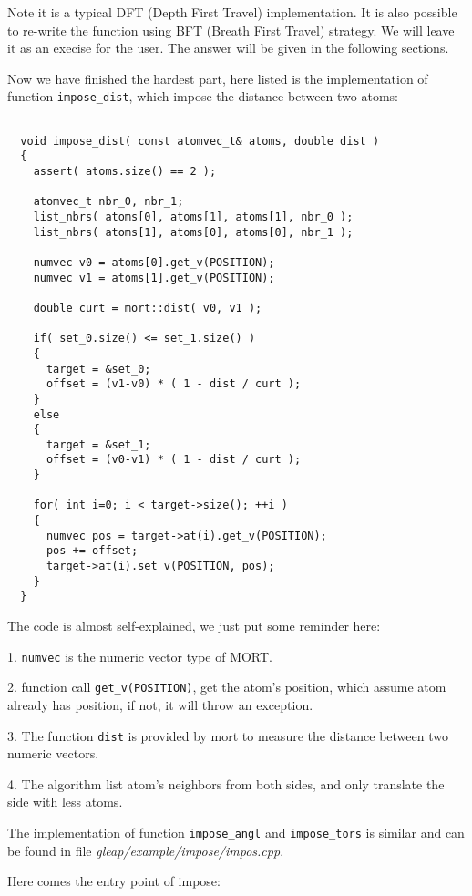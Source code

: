 \documentclass[letterpaper]{book}
\begin{document}
Note it is a typical DFT (Depth First Travel) implementation. It is also possible to  
re-write the function using BFT (Breath First Travel) strategy. We will leave it as an execise
for the user. The answer will be given in the following sections.
 
Now we have finished the hardest part, here listed is the implementation of function 
\lstinline$impose_dist$, which impose the distance between two atoms:


\begin{lstlisting}

  void impose_dist( const atomvec_t& atoms, double dist )
  {
    assert( atoms.size() == 2 );

    atomvec_t nbr_0, nbr_1;
    list_nbrs( atoms[0], atoms[1], atoms[1], nbr_0 );
    list_nbrs( atoms[1], atoms[0], atoms[0], nbr_1 );

    numvec v0 = atoms[0].get_v(POSITION);
    numvec v1 = atoms[1].get_v(POSITION);
    
    double curt = mort::dist( v0, v1 );

    if( set_0.size() <= set_1.size() )
    {
      target = &set_0;
      offset = (v1-v0) * ( 1 - dist / curt );
    }
    else
    {
      target = &set_1;
      offset = (v0-v1) * ( 1 - dist / curt );
    }

    for( int i=0; i < target->size(); ++i )
    {
      numvec pos = target->at(i).get_v(POSITION);
      pos += offset;
      target->at(i).set_v(POSITION, pos);
    }
  }

\end{lstlisting}

The code is almost self-explained, we just put some reminder here:

1. \lstinline$numvec$ is the numeric vector type of MORT.


2. function call \lstinline$get_v(POSITION)$, get the atom's position, which assume
atom already has position, if not, it will throw an exception.


3. The function \lstinline$dist$ is provided by mort to measure the distance between
two numeric vectors. 


4. The algorithm list atom's neighbors from both sides, and only translate the side
with less atoms.


The implementation of function \lstinline$impose_angl$ and \lstinline$impose_tors$ is similar 
and can be found in file {\it gleap/example/impose/impos.cpp}.


Here comes the entry point of impose:
\end{document}
